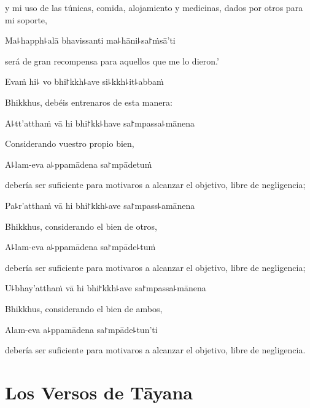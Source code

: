 \begin{english}
	y mi uso de las túnicas, comida, alojamiento y medicinas, dados por otros para mi soporte,
\end{english}

Ma꜕happh꜕alā bhavissanti ma꜕hāni꜕sa꜓ṁsā'ti

\begin{english}
	será de gran recompensa para aquellos que me lo dieron.’
\end{english}

Evaṁ hi꜕ vo bhi꜓kkh꜕ave si꜕kkh꜕it꜕abbaṁ

\begin{english}
	Bhikkhus, debéis entrenaros de esta manera:
\end{english}

A꜕tt'atthaṁ vā hi bhi꜓kk꜕have sa꜓mpassa꜕mānena

\begin{english}
	Considerando vuestro propio bien,
\end{english}

A꜕lam-eva a꜕ppamādena sa꜓mpādetuṁ

\begin{english}
	debería ser suficiente para motivaros a alcanzar el objetivo, libre de negligencia;
\end{english}

Pa꜕r'atthaṁ vā hi bhi꜓kkh꜕ave sa꜓mpass꜕amānena

\begin{english}
	Bhikkhus, considerando el bien de otros,
\end{english}

A꜕lam-eva a꜕ppamādena sa꜓mpāde꜕tuṁ

\begin{english}
	debería ser suficiente para motivaros a alcanzar el objetivo, libre de negligencia;
\end{english}

U꜕bhay'atthaṁ vā hi bhi꜓kkh꜕ave sa꜓mpassa꜕mānena

\begin{english}
	Bhikkhus, considerando el bien de ambos,
\end{english}

Alam-eva a꜕ppamādena sa꜓mpāde꜕tun'ti

\begin{english}
	debería ser suficiente para motivaros a alcanzar el objetivo, libre de negligencia.
\end{english}

\chapter{Los Versos de Tāyana}

